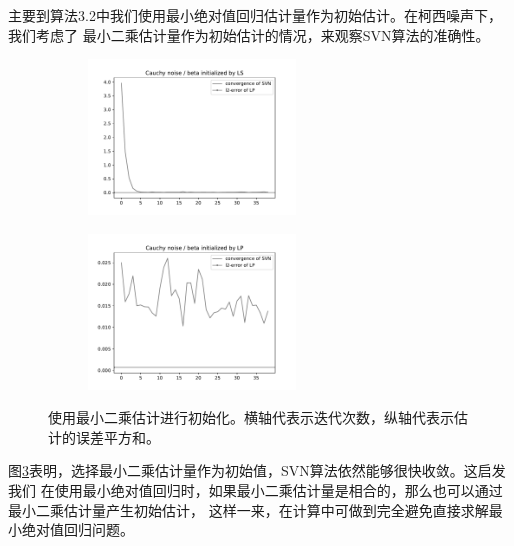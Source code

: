 主要到算法3.2中我们使用最小绝对值回归估计量作为初始估计。在柯西噪声下，我们考虑了
最小二乘估计量作为初始估计的情况，来观察SVN算法的准确性。

\begin{figure}[H]
    \centering
    \begin{subfigure}[t]{0.3\textwidth}\label{svn-demo2}
    \includegraphics[width=5.5cm]{pics/chapter2/l2-svn-demo.pdf}
    \end{subfigure}
    \begin{subfigure}[t]{0.3\textwidth}\label{svn-demo3}
    \includegraphics[width=5.5cm]{pics/chapter2/l1-svn-demo.pdf}
    \end{subfigure}
    \caption{ \small 使用最小二乘估计进行初始化。横轴代表示迭代次数，纵轴代表示估计的误差平方和。}
    \label{svn-l2-demo}
\end{figure}

图\ref{svn-l2-demo}表明，选择最小二乘估计量作为初始值，SVN算法依然能够很快收敛。这启发我们
在使用最小绝对值回归时，如果最小二乘估计量是相合的，那么也可以通过最小二乘估计量产生初始估计，
这样一来，在计算中可做到完全避免直接求解最小绝对值回归问题。

